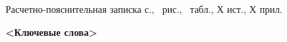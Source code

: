 		\begin{center}
    	Расчетно-пояснительная записка \pageref{LastPage} с., \totalfigures\ рис., \totaltables\ табл., Х ист., Х прил.
    	
		\textbf{<Ключевые слова>}
	\end{center}
\pagebreak